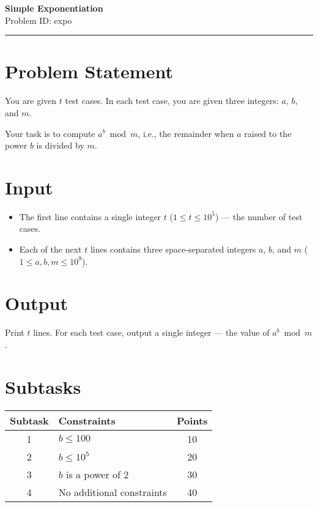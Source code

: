 \documentclass[12pt,a4paper]{article}
\begin{document}
\begin{center}
    {\LARGE \textbf{Simple Exponentiation}} \\[0.5em]
    {Problem ID: expo} \\[1em]
    \rule{\textwidth}{0.4pt}
\end{center}

\vspace{1em}

\section*{Problem Statement}
You are given $t$ test cases.  
In each test case, you are given three integers: $a$, $b$, and $m$.  

Your task is to compute $a^b \bmod m$, i.e., the remainder when $a$ raised to the power $b$ is divided by $m$.

\section*{Input}
\begin{itemize}
    \item The first line contains a single integer $t$ ($1 \le t \le 10^5$) — the number of test cases.  
    \item Each of the next $t$ lines contains three space-separated integers $a$, $b$, and $m$ ($1 \le a, b, m \le 10^9$).  
\end{itemize}

\section*{Output}
Print $t$ lines.  
For each test case, output a single integer — the value of $a^b \bmod m$.

\section*{Subtasks}
\begin{center}
\begin{tabularx}{\textwidth}{|c|X|c|}
\hline
\textbf{Subtask} & \textbf{Constraints} & \textbf{Points} \\
\hline
1 & $b \leq 100$ & 10 \\
\hline
2 & $b \leq 10^5$ & 20 \\
\hline
3 & $b$ is a power of $2$ & 30 \\
\hline
4 & No additional constraints & 40 \\
\hline
\end{tabularx}
\end{center}
\end{document}
